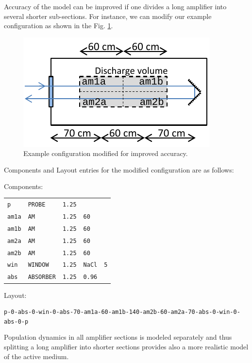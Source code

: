 \documentclass{report}
\begin{document}
Accuracy of the model can be improved if one divides a long amplifier into several shorter sub-sections. For instance, we can modify our example configuration as shown in the Fig. \ref{fig:optical-configuration-2}.

\begin{figure}[ht]
\centering
\includegraphics{images/optical-configuration-2}
\caption{Example configuration modified for improved accuracy.}\label{fig:optical-configuration-2}
\end{figure}
 
Components and Layout entries for the modified configuration are as follows:

\bigskip
Components:

\bigskip
\begin{tabular}{lllll}
\texttt{p}   & \texttt{PROBE}    & \texttt{1.25} &               &           \\
\texttt{am1a} & \texttt{AM}      & \texttt{1.25} & \texttt{60}  &           \\
\texttt{am1b} & \texttt{AM}      & \texttt{1.25} & \texttt{60}  &           \\
\texttt{am2a} & \texttt{AM}      & \texttt{1.25} & \texttt{60}  &           \\
\texttt{am2b} & \texttt{AM}      & \texttt{1.25} & \texttt{60}  &           \\
\texttt{win} & \texttt{WINDOW}   & \texttt{1.25} & \texttt{NaCl} & \texttt{5}\\
\texttt{abs} & \texttt{ABSORBER} & \texttt{1.25} & \texttt{0.96} &
\end{tabular}
\bigskip

Layout:

\bigskip
\texttt{p-0-abs-0-win-0-abs-70-am1a-60-am1b-140-am2b-60-am2a-70-abs-0-win-0-abs-0-p}
\bigskip

Population dynamics in all amplifier sections is modeled separately and thus splitting a long amplifier into shorter sections provides also a more realistic model of the active medium.
\end{document}
